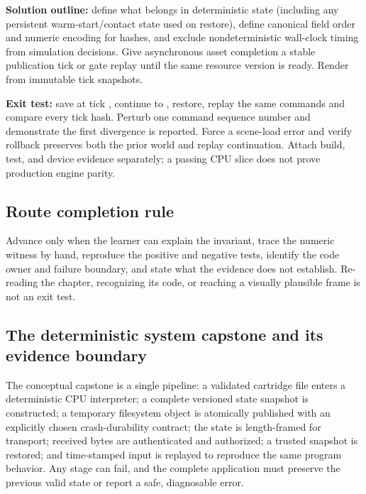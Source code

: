\textbf{Solution outline:} define what belongs in deterministic state (including any persistent warm-start/contact state used on restore), define canonical field order and numeric encoding for hashes, and exclude nondeterministic wall-clock timing from simulation decisions. Give asynchronous asset completion a stable publication tick or gate replay until the same resource version is ready. Render from immutable tick snapshots.

\textbf{Exit test:} save at tick , continue to , restore, replay the same commands and compare every tick hash. Perturb one command sequence number and demonstrate the first divergence is reported. Force a scene-load error and verify rollback preserves both the prior world and replay continuation. Attach build, test, and device evidence separately; a passing CPU slice does not prove production engine parity.

\subsection{Route completion rule}\label{06-engine-ii-ch042-route-completion-rule}

\hypertarget{06-engine-ii-ch042-route-completion-rule}{}

Advance only when the learner can explain the invariant, trace the numeric witness by hand, reproduce the positive and negative tests, identify the code owner and failure boundary, and state what the evidence does not establish. Re-reading the chapter, recognizing its code, or reaching a visually plausible frame is not an exit test.

\subsection{The deterministic system capstone and its evidence boundary}\label{06-engine-ii-ch042-the-deterministic-system-capstone-and-its-evidence-boundary}

\hypertarget{06-engine-ii-ch042-the-deterministic-system-capstone-and-its-evidence-boundary}{}

The conceptual capstone is a single pipeline: a validated cartridge file enters a deterministic CPU interpreter; a complete versioned state snapshot is constructed; a temporary filesystem object is atomically published with an explicitly chosen crash-durability contract; the state is length-framed for transport; received bytes are authenticated and authorized; a trusted snapshot is restored; and time-stamped input is replayed to reproduce the same program behavior. Any stage can fail, and the complete application must preserve the previous valid state or report a safe, diagnosable error.

